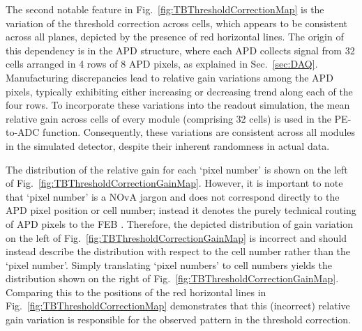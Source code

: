 The second notable feature in Fig.~\ref{fig:TBThresholdCorrectionMap} is the variation of the threshold correction across cells, which appears to be consistent across all planes, depicted by the presence of red horizontal lines. The origin of this dependency is in the \gls{APD} structure, where each \gls{APD} collects signal from 32 cells arranged in 4 rows of 8 \gls{APD} pixels, as explained in Sec.~\ref{sec:DAQ}. Manufacturing discrepancies \cite{NOvA-doc-5239} lead to relative gain variations among the \gls{APD} pixels, typically exhibiting either increasing or decreasing trend along each of the four rows. To incorporate these variations into the readout simulation, the mean relative gain across cells of every module (comprising 32 cells) is used in the \gls{PE}-to-\gls{ADC} function. Consequently, these variations are consistent across all modules in the simulated detector, despite their inherent randomness in actual data.

The distribution of the relative gain for each `pixel number' is shown on the left of Fig.~\ref{fig:TBThresholdCorrectionGainMap}. However, it is important to note that `pixel number' is a \gls{NOvA} jargon and does not correspond directly to the \gls{APD} pixel position or cell number; instead it denotes the purely technical routing of \gls{APD} pixels to the \gls{FEB} \cite{NOvA-doc-11570}. Therefore, the depicted distribution of gain variation on the left of Fig.~\ref{fig:TBThresholdCorrectionGainMap} is incorrect and should instead describe the distribution with respect to the cell number rather than the `pixel number'. Simply translating `pixel numbers' to cell numbers yields the distribution shown on the right of Fig.~\ref{fig:TBThresholdCorrectionGainMap}. Comparing this to the positions of the red horizontal lines in Fig.~\ref{fig:TBThresholdCorrectionMap} demonstrates that this (incorrect) relative gain variation is responsible for the observed pattern in the threshold correction.

